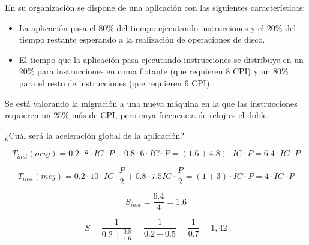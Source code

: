 \begin{acexercise}\end{acexercise}

En su organización se dispone de una aplicación con las siguientes características:

\begin{itemize}

\item La aplicación pasa el 80\% del tiempo ejecutando instrucciones y el 20\%
del tiempo restante esperando a la realización de operaciones de disco.

\item El tiempo que la aplicación pasa ejecutando instrucciones se distribuye
en un 20\% para instrucciones en coma flotante (que requieren 8 CPI) y un 80\%
para el resto de instrucciones (que requieren 6 CPI).

\end{itemize}

Se está valorando la migración a una nueva máquina en la que las instrucciones
requieren un 25\% más de CPI, pero cuya frecuencia de reloj es el doble.

¿Cuál será la aceleración global de la aplicación?


\begin{acsolution}\end{acsolution}

\[ 
T_{inst}(orig) = 
0.2 \cdot 8 \cdot IC \cdot P+ 0.8 \cdot 6 \cdot IC \cdot P = 
(1.6 + 4.8) \cdot IC \cdot P = 
6.4 \cdot IC \cdot P 
\]

\[ 
T_{inst}(mej) = 
0.2 \cdot 10 \cdot IC \cdot \frac{P}{2} + 0.8 \cdot 7.5 IC \cdot \frac{P}{2} = 
(1 + 3) \cdot IC \cdot P = 
4 \cdot IC \cdot P 
\]

\[ 
S_{inst} = 
\frac{6.4}{4} = 
1.6 
\]

\[ 
S = 
\frac{1}{0.2 + \frac{0.8}{1.6}} = 
\frac{1}{0.2 + 0.5} = 
\frac{1}{0.7} =1,42 
\]

